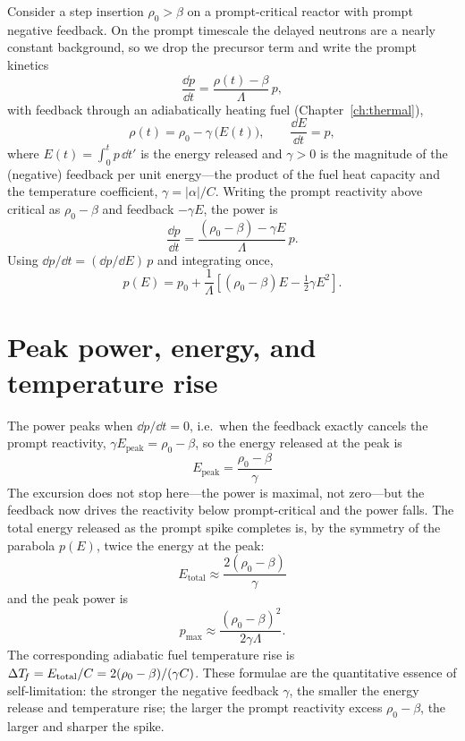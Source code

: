Consider a step insertion $\rho_0>\beta$ on a prompt-critical reactor with prompt
negative feedback. On the prompt timescale the delayed neutrons are a nearly
constant background, so we drop the precursor term and write the prompt kinetics
\begin{equation}
\frac{\dd p}{\dd t} = \frac{\rho(t)-\beta}{\Lambda}\,p,
\end{equation}
with feedback through an adiabatically heating fuel (Chapter~\ref{ch:thermal}),
\begin{equation}
\rho(t) = \rho_0 - \gamma\,\big(E(t)\big),\qquad
\frac{\dd E}{\dd t} = p,
\end{equation}
where $E(t)=\int_0^t p\,\dd t'$ is the energy released and $\gamma>0$ is the
magnitude of the (negative) feedback per unit energy---the product of the fuel
heat capacity and the temperature coefficient, $\gamma=|\alpha|/C$. Writing the
prompt reactivity above critical as $\rho_0-\beta$ and feedback $-\gamma E$, the
power is
\begin{equation}
\frac{\dd p}{\dd t} = \frac{(\rho_0-\beta) - \gamma E}{\Lambda}\,p.
\end{equation}
Using $\dd p/\dd t = (\dd p/\dd E)\,p$ and integrating once,
\begin{equation}
p(E) = p_0 + \frac{1}{\Lambda}\!\left[(\rho_0-\beta)E - \tfrac12\gamma E^2\right].
\end{equation}

\section{Peak power, energy, and temperature rise}

The power peaks when $\dd p/\dd t=0$, i.e.\ when the feedback exactly cancels the
prompt reactivity, $\gamma E_{\text{peak}} = \rho_0-\beta$, so the energy released
at the peak is
\begin{equation}
\boxed{\ E_{\text{peak}} = \frac{\rho_0-\beta}{\gamma}\ }
\end{equation}
The excursion does not stop here---the power is maximal, not zero---but the
feedback now drives the reactivity below prompt-critical and the power falls. The
total energy released as the prompt spike completes is, by the symmetry of the
parabola $p(E)$, twice the energy at the peak:
\begin{equation}
\boxed{\ E_{\text{total}} \approx \frac{2(\rho_0-\beta)}{\gamma}\ }
\end{equation}
and the peak power is
\begin{equation}
p_{\max} \approx \frac{(\rho_0-\beta)^2}{2\gamma\Lambda}.
\end{equation}
The corresponding adiabatic fuel temperature rise is
$\Delta T_{\!f} = E_{\text{total}}/C = 2(\rho_0-\beta)/(\gamma C)$. These formulae are
the quantitative essence of self-limitation: the stronger the negative feedback
$\gamma$, the smaller the energy release and temperature rise; the larger the
prompt reactivity excess $\rho_0-\beta$, the larger and sharper the spike.

